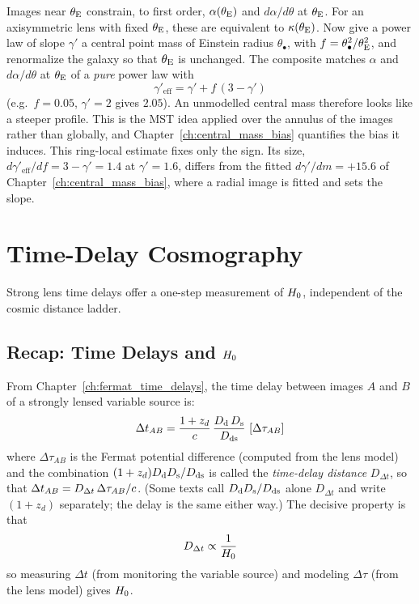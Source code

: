 \begin{bridge}
Images near $\theta_{\mathrm{E}}$ constrain, to first order, $\alpha(\theta_{\mathrm{E}})$ and
$d\alpha/d\theta$ at $\theta_{\mathrm{E}}$.  For an axisymmetric lens with fixed $\theta_{\mathrm{E}}$,
these are equivalent to $\kappa(\theta_{\mathrm{E}})$.  Now give a power law of slope
$\gamma'$ a central point mass of Einstein radius $\theta_\bullet$, with
$f = \theta_\bullet^2/\theta_{\mathrm{E}}^2$, and renormalize the galaxy so that $\theta_{\mathrm{E}}$
is unchanged.  The composite matches $\alpha$ and $d\alpha/d\theta$ at $\theta_{\mathrm{E}}$
of a \emph{pure} power law with
\[
  \gamma'_{\mathrm{eff}} = \gamma' + f\,(3-\gamma')
\]
(e.g.\ $f = 0.05$, $\gamma' = 2$ gives $2.05$).  An unmodelled central mass
therefore looks like a steeper profile.  This is the MST idea applied over
the annulus of the images rather than globally, and
Chapter~\ref{ch:central_mass_bias} quantifies the bias it induces.
This ring-local estimate fixes only the sign.  Its size,
$d\gamma'_{\mathrm{eff}}/df = 3-\gamma' = 1.4$ at $\gamma' = 1.6$, differs
from the fitted $d\gamma'/dm = +15.6$ of Chapter~\ref{ch:central_mass_bias},
where a radial image is fitted and sets the slope.
\end{bridge}



\section{Time-Delay Cosmography}
\label{sec:time_delay_cosmography}

Strong lens time delays offer a one-step measurement of $H_0$,
independent of the cosmic distance ladder.

\subsection{Recap: Time Delays and $H_0$}

From Chapter~\ref{ch:fermat_time_delays}, the time delay between
images $A$ and $B$ of a strongly lensed variable source is:
\begin{equation}
    \Delta t_{AB} = \frac{1 + z_d}{c}
    \,\frac{D_{\mathrm{d}}\,D_{\mathrm{s}}}{D_{\mathrm{ds}}}
    \,\left[\Delta\tau_{AB}\right]
    \label{eq:time_delay_recap}
\end{equation}
where $\Delta\tau_{AB}$ is the Fermat potential difference (computed
from the lens model) and the combination $(1+z_d)D_{\mathrm{d}}D_{\mathrm{s}}/D_{\mathrm{ds}}$ is
called the \emph{time-delay distance} $D_{\Delta t}$, so that
$\Delta t_{AB} = D_{\Delta t}\,\Delta\tau_{AB}/c$.  (Some
texts call $D_{\mathrm{d}}D_{\mathrm{s}}/D_{\mathrm{ds}}$ alone $D_{\Delta t}$ and write $(1+z_d)$
separately; the delay is the same either way.)  The decisive
property is that
\begin{equation}
    D_{\Delta t} \propto \frac{1}{H_0}
    \label{eq:Ddt_H0}
\end{equation}
so measuring $\Delta t$ (from monitoring the variable source) and
modeling $\Delta\tau$ (from the lens model) gives $H_0$.

